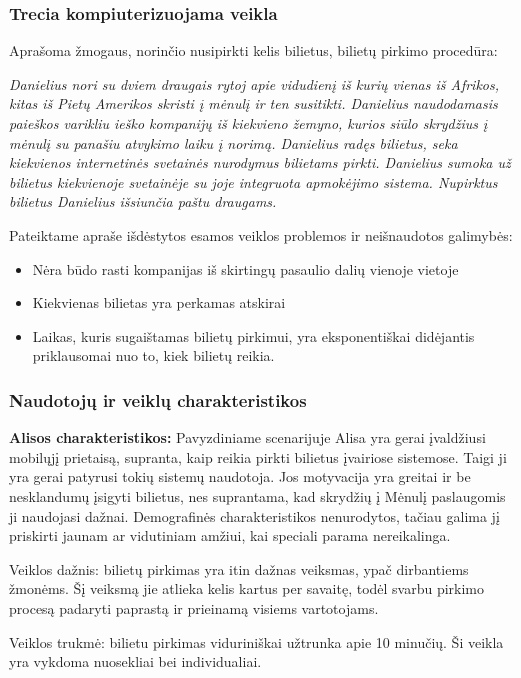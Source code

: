 \documentclass{VUMIFPSkursinis}
\begin{document}
\subsubsection{Trecia kompiuterizuojama veikla}
Aprašoma žmogaus, norinčio nusipirkti kelis bilietus, bilietų pirkimo procedūra:

\bigskip
\textit{Danielius nori su dviem draugais rytoj apie vidudienį iš kurių vienas iš Afrikos, kitas iš Pietų Amerikos skristi į mėnulį ir ten susitikti. Danielius naudodamasis paieškos varikliu ieško kompanijų iš kiekvieno žemyno, kurios siūlo skrydžius į mėnulį su panašiu atvykimo laiku į norimą. Danielius radęs bilietus, seka kiekvienos internetinės svetainės nurodymus bilietams pirkti. Danielius sumoka už bilietus kiekvienoje svetainėje su joje integruota apmokėjimo sistema. Nupirktus bilietus Danielius išsiunčia paštu draugams.}

\bigskip
Pateiktame apraše išdėstytos esamos veiklos problemos ir neišnaudotos galimybės:  
\begin{itemize}
\item Nėra būdo rasti kompanijas iš skirtingų pasaulio dalių vienoje vietoje
\item Kiekvienas bilietas yra perkamas atskirai
\item Laikas, kuris sugaištamas bilietų pirkimui, yra eksponentiškai didėjantis priklausomai nuo to, kiek bilietų reikia.
\end{itemize}

\subsubsection{Naudotojų ir veiklų charakteristikos}
\textbf{Alisos charakteristikos: } Pavyzdiniame scenarijuje Alisa yra gerai įvaldžiusi mobilųjį prietaisą, supranta, kaip reikia pirkti bilietus įvairiose sistemose. Taigi ji yra gerai patyrusi tokių sistemų naudotoja. Jos motyvacija yra greitai ir be nesklandumų įsigyti bilietus, nes suprantama, kad skrydžių į Mėnulį paslaugomis ji naudojasi dažnai. Demografinės charakteristikos nenurodytos, tačiau galima jį priskirti jaunam ar vidutiniam amžiui, kai speciali parama nereikalinga. 

Veiklos dažnis: bilietų pirkimas yra itin dažnas veiksmas, ypač dirbantiems žmonėms. Šį veiksmą jie atlieka kelis kartus per savaitę, todėl svarbu pirkimo procesą padaryti paprastą ir prieinamą visiems vartotojams.

Veiklos trukmė: bilietu pirkimas viduriniškai užtrunka apie 10 minučių. Ši veikla yra vykdoma nuosekliai bei individualiai.
\end{document}
